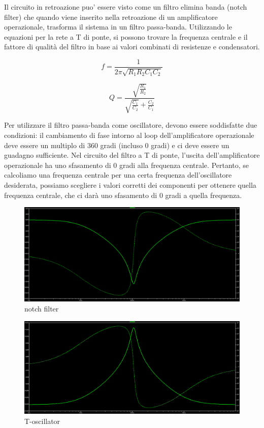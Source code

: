 \documentclass{article}
\theoremstyle{definition}
\begin{document}
Il circuito in retroazione puo' essere visto come un filtro elimina banda  (notch filter) 
che quando viene inserito nella retroazione di un amplificatore operazionale, trasforma il sistema in un filtro passa-banda. Utilizzando le equazioni per la rete a T di ponte, si possono trovare la frequenza centrale e il fattore di qualità del filtro in base ai valori combinati di resistenze e condensatori.

\begin{equation}
    f = \frac{1}{2 \pi\sqrt{R_1 R_2 C_1 C_2}}
\end{equation}

\begin{equation}
    Q = \frac{\sqrt{\frac{R_1}{R_2}}}{\sqrt{\frac{C_1}{C_2}} + {\frac{C_2}{C_1}}}
\end{equation}


Per utilizzare il filtro passa-banda come oscillatore, devono essere soddisfatte due condizioni: il cambiamento di fase intorno al loop dell'amplificatore operazionale deve essere un multiplo di 360 gradi (incluso 0 gradi) e ci deve essere un guadagno sufficiente.
Nel circuito del filtro a T di ponte, l'uscita dell'amplificatore operazionale ha uno sfasamento di 0 gradi alla frequenza centrale. Pertanto, se calcoliamo una frequenza centrale per una certa frequenza dell'oscillatore desiderata, possiamo scegliere i valori corretti dei componenti per ottenere quella frequenza centrale, che ci darà uno sfasamento di 0 gradi a quella frequenza. 

\begin{figure}[htp]
    \centering
    \includegraphics[width=\textwidth]{notch2.png} 
    \caption{notch filter}
    \label{fig:Notch-filter}
\end{figure}

\begin{figure}[htp]
    \centering
    \includegraphics[width=\textwidth]{toscillatorefrequency.png} 
    \caption{T-oscillator}
    \label{fig:Toscillator-plot}
\end{figure}
\end{document}

